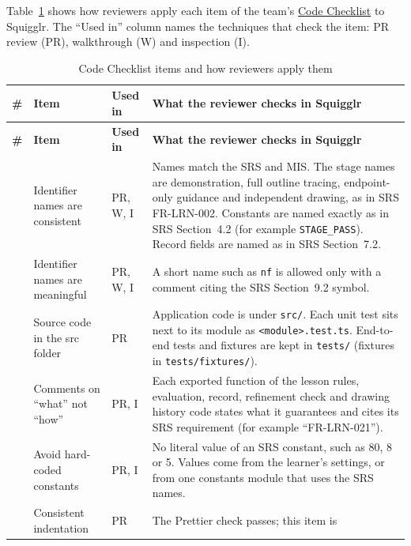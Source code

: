 \documentclass[12pt, titlepage]{article}
\begin{document}
Table~\ref{tab:code-checklist} shows how reviewers apply each item of the
team's
\href{https://github.com/AHMEDELZARIA/squigglr/blob/main/docs/Checklists/Code-Checklist.tex}{Code
Checklist} to Squigglr. The ``Used in'' column names the techniques that
check the item: PR review (PR), walkthrough (W) and inspection (I).

{\small
\begin{longtable}{@{}>{\raggedright\arraybackslash}p{}%
>{\raggedright\arraybackslash}p{}%
>{\raggedright\arraybackslash}p{}%
>{\raggedright\arraybackslash}p{}@{}}
\caption{Code Checklist items and how reviewers apply them}
\label{tab:code-checklist}\\
\toprule
\textbf{\#} & \textbf{Item} & \textbf{Used in} &
\textbf{What the reviewer checks in Squigglr}\\
\midrule
\endfirsthead
\toprule
\textbf{\#} & \textbf{Item} & \textbf{Used in} &
\textbf{What the reviewer checks in Squigglr}\\
\midrule
\endhead
1 & Identifier names are consistent & PR, W, I & Names match the SRS and
MIS. The stage names are demonstration, full outline tracing, endpoint-only
guidance and independent drawing, as in SRS FR-LRN-002. Constants are named
exactly as in SRS Section~4.2 (for example \texttt{STAGE\_PASS}). Record
fields are named as in SRS Section~7.2.\\
\addlinespace
2 & Identifier names are meaningful & PR, W, I & A short name such as
\texttt{nf} is allowed only with a comment citing the SRS Section~9.2
symbol.\\
\addlinespace
3 & Source code in the src folder & PR & Application code is under
\texttt{src/}. Each unit test sits next to its module as
\texttt{<module>.test.ts}. End-to-end tests and fixtures are kept in
\texttt{tests/} (fixtures in \texttt{tests/fixtures/}).\\
\addlinespace
4 & Comments on ``what'' not ``how'' & PR, I & Each exported function of
the lesson rules, evaluation, record, refinement check and drawing history
code states what it guarantees and cites its SRS requirement (for example
``FR-LRN-021'').\\
\addlinespace
5 & Avoid hard-coded constants & PR, I & No literal value of an SRS
constant, such as 80, 8 or 5. Values come from the learner's settings, or
from one constants module that uses the SRS names.\\
\addlinespace
6 & Consistent indentation & PR & The Prettier check passes; this item is

\end{longtable}}
\end{document}
